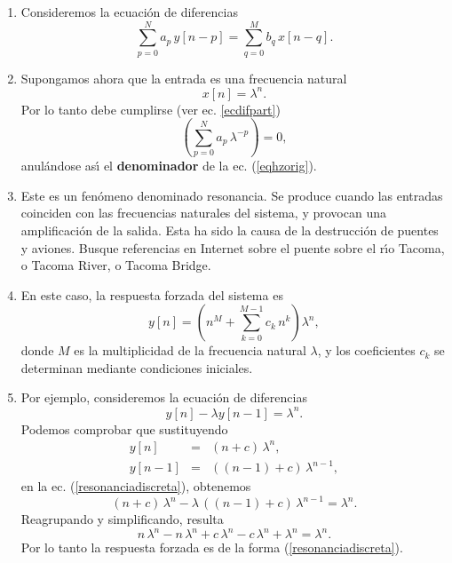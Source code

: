 \begin{enumerate}

\item Consideremos la ecuaci\'{o}n de diferencias
\begin{equation}
  \sum_{p=0}^{N}a_{p} \, y\left[ n-p\right] =
  \sum_{q=0}^{M}b_{q} \, x\left[ n-q\right]. \label{ecdiflinealnat}
\end{equation}

\item Supongamos ahora que la entrada es una frecuencia natural
\begin{equation}
  x\left[ n\right] = \lambda^{n}.
\end{equation}
Por lo tanto debe cumplirse (ver ec. \ref{ecdifpart})
\begin{equation}
  \left( \sum_{p=0}^{N}a_{p} \, \lambda^{-p}\right) = 0,
\end{equation}
anul\'{a}ndose as\'{\i} el \textbf{denominador} de la ec. (\ref{eqhzorig}).

\item Este es un fen\'{o}meno denominado resonancia. Se produce cuando las entradas coinciden con las
frecuencias naturales del sistema, y provocan una amplificaci\'{o}n de la salida. Esta ha sido la causa
de la destrucci\'{o}n de puentes y aviones. Busque referencias en Internet sobre el puente sobre el 
r\'{\i}o Tacoma, o Tacoma River, o Tacoma Bridge.

\item En este caso, la respuesta forzada del sistema es
\begin{equation}
  y[n] = \left(n^{M} + \sum_{k=0}^{M-1} c_{k} \, n^{k}\right) \lambda^{n}, \label{resonanciadiscreta}
\end{equation}
donde $M$ es la multiplicidad de la frecuencia natural $\lambda$, y los coeficientes $c_{k}$ se
determinan mediante condiciones iniciales.

\item Por ejemplo, consideremos la ecuaci\'{o}n de diferencias
\begin{equation}
  y[n] - \lambda y[n-1]= \lambda^{n}. 
\end{equation}
Podemos comprobar que sustituyendo
\begin{eqnarray}
  y[n] &=&  (n + c) \, \lambda^{n}, \label{resonanciadiscretarespuesta} \\
  y[n-1] &=&  ((n - 1) + c) \, \lambda^{n-1},
\end{eqnarray}
en la ec. (\ref{resonanciadiscreta}), obtenemos
\begin{equation}
  (n + c) \, \lambda^{n} - \lambda \, ((n - 1) + c) \, \lambda^{n-1} = \lambda^{n}.
\end{equation}
Reagrupando y simplificando, resulta
\begin{equation}
   n \, \lambda^{n} - n \, \lambda^{n} + c \, \lambda^{n} - c \, \lambda^{n} + \lambda^{n} = \lambda^{n}.
\end{equation}
Por lo tanto la respuesta forzada es de la forma (\ref{resonanciadiscreta}).

\end{enumerate}

